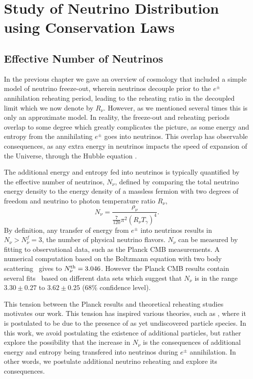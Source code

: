 \chapter{ Study of Neutrino Distribution using Conservation Laws}\label{ch:model_ind}

\section{Effective Number of Neutrinos}\label{sec:N_nu}
In the previous chapter we gave an overview of cosmology that included a simple model of neutrino freeze-out, wherein neutrinos decouple prior to the $e^\pm$ annihilation reheating period, leading to the reheating ratio in the decoupled limit  which we now denote by $R_\nu$. However, as we mentioned several times this is only an approximate model. In reality, the freeze-out and reheating periods overlap to some degree which greatly complicates the picture, as some energy and entropy from the annihilating $e^\pm$ goes into neutrinos.  This overlap has observable consequences, as any extra energy in neutrinos impacts the speed of expansion of the Universe, through the Hubble equation .

The additional energy and entropy fed into neutrinos is typically quantified by the effective number of neutrinos, $N_\nu$, defined by comparing the total neutrino energy density to the energy density of a massless fermion with two degrees of freedom and neutrino to photon temperature ratio $R_\nu$,
\begin{equation}
N_{\nu}=\frac{\rho_\nu}{\frac{7}{120}\pi^2  \left(R_\nu T_\gamma\right)^4}.
\end{equation}
 By definition, any transfer of energy from $e^\pm$ into neutrinos results in $N_\nu>N_\nu^f=3$, the number of physical neutrino flavors.  $N_\nu$ can be  measured by fitting to observational data, such as the Planck CMB measurements. A numerical computation based on the Boltzmann equation with two body scattering~\cite{Mangano2005} gives to $N_{\nu}^{\rm th}=3.046$. However the Planck CMB results contain several fits~\cite{Planck} based on different data sets which suggest that $N_\nu$ is in the range $3.30\pm 0.27$ to $3.62\pm0.25$ ($68\%$ confidence level). 

This tension between the Planck results and theoretical reheating studies motivates our work. This tension has inspired various theories, such as \cite{Weinberg:2013kea}, where it is postulated to be due to the presence of as yet undiscovered particle species. In this work, we avoid postulating the existence of additional particles, but rather explore the possibility that the increase in $N_\nu$ is the consequences of additional energy and entropy being transfered into neutrinos during $e^\pm$ annihilation.  In other words, we postulate additional neutrino reheating and explore its consequences.



